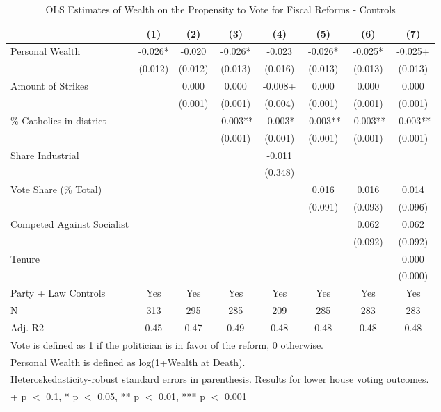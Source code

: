 \begin{table}

\caption{\label{tab:controls_ols}OLS Estimates of Wealth on the Propensity to Vote for Fiscal Reforms - Controls}
\centering
\begin{tabular}[t]{lccccccc}
\toprule
  & (1) & (2) & (3) & (4) & (5) & (6) & (7)\\
\midrule
Personal Wealth & -0.026* & -0.020 & -0.026* & -0.023 & -0.026* & -0.025* & -0.025+\\
 & (0.012) & (0.012) & (0.013) & (0.016) & (0.013) & (0.013) & (0.013)\\
Amount of Strikes &  & 0.000 & 0.000 & -0.008+ & 0.000 & 0.000 & 0.000\\
 &  & (0.001) & (0.001) & (0.004) & (0.001) & (0.001) & (0.001)\\
\% Catholics in district &  &  & -0.003** & -0.003* & -0.003** & -0.003** & -0.003**\\
 &  &  & (0.001) & (0.001) & (0.001) & (0.001) & (0.001)\\
Share Industrial &  &  &  & -0.011 &  &  & \\
 &  &  &  & (0.348) &  &  & \\
Vote Share (\% Total) &  &  &  &  & 0.016 & 0.016 & 0.014\\
 &  &  &  &  & (0.091) & (0.093) & (0.096)\\
Competed Against Socialist &  &  &  &  &  & 0.062 & 0.062\\
 &  &  &  &  &  & (0.092) & (0.092)\\
Tenure &  &  &  &  &  &  & 0.000\\
 &  &  &  &  &  &  & (0.000)\\
\midrule
Party + Law Controls & Yes & Yes & Yes & Yes & Yes & Yes & Yes\\
N & 313 & 295 & 285 & 209 & 285 & 283 & 283\\
Adj. R2 & 0.45 & 0.47 & 0.49 & 0.48 & 0.48 & 0.48 & 0.48\\
\bottomrule
\multicolumn{8}{l}{\rule{0pt}{1em}Vote is defined as 1 if the politician is in favor of the reform, 0 otherwise.}\\
\multicolumn{8}{l}{\rule{0pt}{1em}Personal Wealth is defined as log(1+Wealth at Death).}\\
\multicolumn{8}{l}{\rule{0pt}{1em}Heteroskedasticity-robust standard errors in parenthesis. Results for lower house voting outcomes.}\\
\multicolumn{8}{l}{\rule{0pt}{1em}+ p $<$ 0.1, * p $<$ 0.05, ** p $<$ 0.01, *** p $<$ 0.001}\\
\end{tabular}
\end{table}
